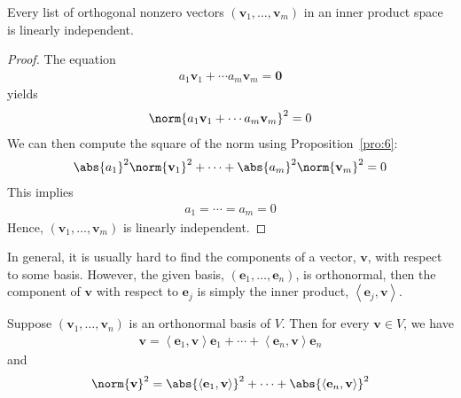 \documentclass[thmcnt=section, color=blue, 12pt]{my-elegantbook}
\begin{document}
\begin{corollary} \label{cor:3}
    Every list of orthogonal nonzero vectors $(\mathbf{v}_1, \ldots, \mathbf{v}_m)$ in an inner product space is linearly independent.
\end{corollary}

\begin{proof}
    The equation 
    \begin{align*}
        a_1 \mathbf{v}_1 + \cdots a_m \mathbf{v}_m = \mathbf{0}
    \end{align*}
    yields
    \begin{align*}
        \norm{a_1 \mathbf{v}_1 + \cdots a_m \mathbf{v}_m}^2 = 0
    \end{align*}
    We can then compute the square of the norm using Proposition~\ref{pro:6}: 
    \begin{align*}
        \abs{a_1}^2 \norm{\mathbf{v}_1}^2 + \cdots + \abs{a_m}^2 \norm{\mathbf{v}_m}^2 = 0
    \end{align*}
    This implies
    \begin{align*}
        a_1 = \cdots = a_m = 0
    \end{align*}
    Hence, $(\mathbf{v}_1, \ldots, \mathbf{v}_m)$ is linearly independent.
\end{proof}


In general, it is usually hard to find the components of a vector, $\mathbf{v}$, with respect to some basis. However, the given basis, $(\mathbf{e}_1, \ldots, \mathbf{e}_n)$, is orthonormal, then the component of $\mathbf{v}$ with respect to $\mathbf{e}_j$ is simply the inner product, $\left\langle \mathbf{e}_j, \mathbf{v} \right\rangle$.

\begin{theorem}
    Suppose $(\mathbf{v}_1, \ldots, \mathbf{v}_n)$ is an orthonormal basis of $V$. Then for every $\mathbf{v} \in V$, we have
    \begin{align}
        \mathbf{v}
        = \left\langle \mathbf{e}_1, \mathbf{v} \right\rangle \mathbf{e}_1 
            + \cdots 
            + \left\langle \mathbf{e}_n, \mathbf{v} \right\rangle \mathbf{e}_n
        \label{eq:29}
    \end{align}
    and 
    \begin{align}
        \norm{\mathbf{v}}^2
        = \abs{\left\langle \mathbf{e}_1, \mathbf{v} \right\rangle}^2
            + \cdots 
            + \abs{\left\langle \mathbf{e}_n, \mathbf{v} \right\rangle}^2
        \label{eq:30}
    \end{align}
\end{theorem}
\end{document}
